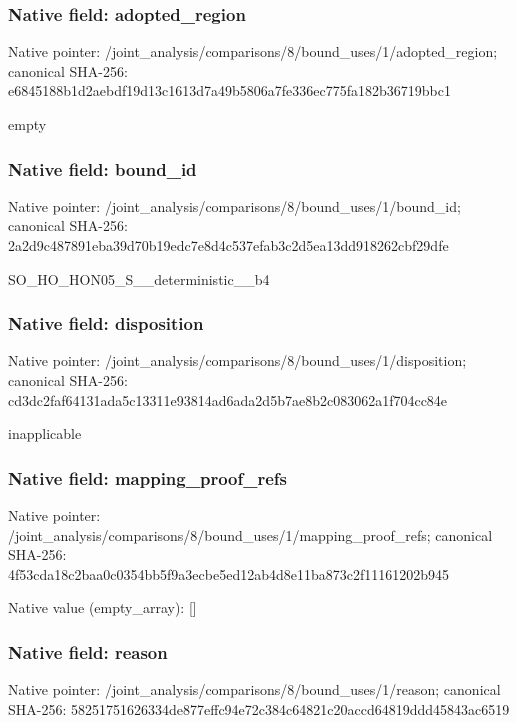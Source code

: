 \documentclass[10pt,a4paper]{article}
\begin{document}
\subsubsection{Native field: adopted\_\allowbreak{}region}
Native pointer: /joint\_\allowbreak{}analysis/comparisons/8/bound\_\allowbreak{}uses/1/adopted\_\allowbreak{}region; canonical SHA-256: e6845188b1d2aebdf19d13c1613d7a49b5806a7fe336ec775fa182b36719bbc1

\begingroup\raggedright\sloppy empty\par\endgroup

\subsubsection{Native field: bound\_\allowbreak{}id}
Native pointer: /joint\_\allowbreak{}analysis/comparisons/8/bound\_\allowbreak{}uses/1/bound\_\allowbreak{}id; canonical SHA-256: 2a2d9c487891eba39d70b19edc7e8d4c537efab3c2d5ea13dd918262cbf29dfe

\begingroup\raggedright\sloppy SO\_\allowbreak{}HO\_\allowbreak{}HON05\_\allowbreak{}S\_\allowbreak{}\_\allowbreak{}deterministic\_\allowbreak{}\_\allowbreak{}b4\par\endgroup

\subsubsection{Native field: disposition}
Native pointer: /joint\_\allowbreak{}analysis/comparisons/8/bound\_\allowbreak{}uses/1/disposition; canonical SHA-256: cd3dc2faf64131ada5c13311e93814ad6ada2d5b7ae8b2c083062a1f704cc84e

\begingroup\raggedright\sloppy inapplicable\par\endgroup

\subsubsection{Native field: mapping\_\allowbreak{}proof\_\allowbreak{}refs}
Native pointer: /joint\_\allowbreak{}analysis/comparisons/8/bound\_\allowbreak{}uses/1/mapping\_\allowbreak{}proof\_\allowbreak{}refs; canonical SHA-256: 4f53cda18c2baa0c0354bb5f9a3ecbe5ed12ab4d8e11ba873c2f11161202b945

Native value (empty\_\allowbreak{}array): []

\subsubsection{Native field: reason}
Native pointer: /joint\_\allowbreak{}analysis/comparisons/8/bound\_\allowbreak{}uses/1/reason; canonical SHA-256: 58251751626334de877effc94e72c384c64821c20accd64819ddd45843ac6519
\end{document}
